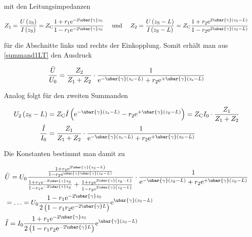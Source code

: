mit den Leitungsimpedanzen


\begin{equation}
	Z_{1}=\frac{U\left(z_{\mathrm{S}}\right)}{I\left(z_{\mathrm{S}}\right)}=Z_{\mathrm{C}} \frac{1+r_{1} \mathrm{e}^{-2 \ubar{\gamma} z_{\mathrm{S}}}}{1-r_{1} \mathrm{e}^{-2 \ubar{\gamma} z_{\mathrm{S}}}} \quad \text { und } \quad Z_{2}=\frac{U\left(z_{\mathrm{S}}-L\right)}{I\left(z_{\mathrm{S}}-L\right)}=Z_{\mathrm{C}} \frac{1+r_{2} \mathrm{e}^{2 \ubar{\gamma}\left(z_{\mathrm{S}}-L\right)}}{1-r_{2} \mathrm{e}^{2 \ubar{\gamma}\left(z_{\mathrm{S}}-L\right)}} 
\end{equation}


für die Abschnitte links und rechts der Einkopplung. Somit erhält man aus \ref{summand1LT} den Ausdruck


\begin{equation}
	\frac{\tilde{U}}{U_{0}}=\frac{Z_{2}}{Z_{1}+Z_{2}} \cdot \frac{1}{\mathrm{e}^{-\ubar{\gamma}\left(z_{\mathrm{s}}-L\right)}+r_{2} \mathrm{e}^{+\ubar{\gamma}\left(z_{\mathrm{s}}-L\right)}} 
\end{equation}


Analog folgt für den zweiten Summanden


\begin{align}
	U_{2}\left(z_{\mathrm{S}}-L\right) & =Z_{\mathrm{C}} \tilde{I}\left(\mathrm{e}^{-\ubar{\gamma}\left(z_{\mathrm{s}}-L\right)}-r_{2} \mathrm{e}^{+\ubar{\gamma}\left(z_{\mathrm{S}}-L\right)}\right)=Z_{\mathrm{C}} I_{0} \cdot \frac{Z_{1}}{Z_{1}+Z_{2}}  \\
	\frac{\tilde{I}}{I_{0}} & =\frac{Z_{1}}{Z_{1}+Z_{2}} \cdot \frac{1}{\mathrm{e}^{-\ubar{\gamma}\left(z_{\mathrm{s}}-L\right)}+r_{2} \mathrm{e}^{+\ubar{\gamma}\left(z_{\mathrm{S}}-L\right)}} 
\end{align}


Die Konstanten bestimmt man damit zu


\begin{align}
	& \tilde{U}=U_{0} \frac{\frac{1+r_{2} \mathrm{e}^{2 \ubar{\gamma}\left(z_{\mathrm{S}}-L\right)}}{1-r_{2} \mathrm{e}^{\ubar{\gamma} \ubar{\gamma}\left(z_{\mathrm{s}}-L\right)}}}{\frac{1+r_{1} \mathrm{e}^{-2 \ubar{\gamma} z_{\mathrm{S}}}}{1-r_{1} \mathrm{e}^{-2 \ubar{\gamma} z_{\mathrm{S}}}}+\frac{1+r_{2} \mathrm{e}^{2 \ubar{\gamma}\left(z_{\mathrm{S}}-L\right)}}{1-r_{2} \mathrm{e}^{2 \ubar{\gamma}\left(z_{\mathrm{S}}-L\right)}}} \cdot \frac{1}{\mathrm{e}^{-\ubar{\gamma}\left(z_{\mathrm{S}}-L\right)}+r_{2} \mathrm{e}^{+\ubar{\gamma}\left(z_{\mathrm{S}}-L\right)}}  \\
	& =\ldots=U_{0} \frac{1-r_{1} \mathrm{e}^{-2 \ubar{\gamma} z_{\mathrm{S}}}}{2\left(1-r_{1} r_{2} \mathrm{e}^{-2 \ubar{\gamma} L}\right)} \mathrm{e}^{\ubar{\gamma}\left(z_{\mathrm{S}}-L\right)}  \\
	& \tilde{I}=I_{0} \frac{1+r_{1} \mathrm{e}^{-2 \ubar{\gamma} z_{\mathrm{S}}}}{2\left(1-r_{1} r_{2} \mathrm{e}^{-2 \ubar{\gamma} L}\right)} \mathrm{e}^{\ubar{\gamma}\left(z_{\mathrm{S}}-L\right)} 
\end{align}


